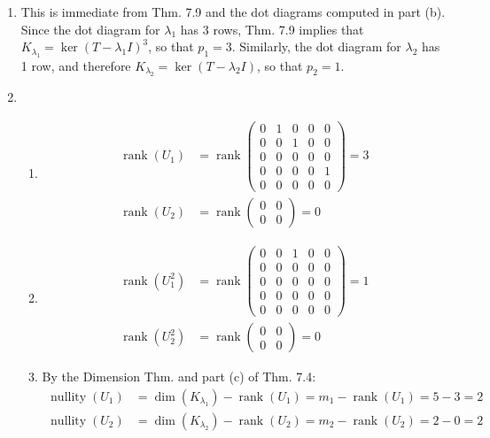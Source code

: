 \documentclass[12pt]{article}
\DeclareMathOperator{\rank}{rank}
\DeclareMathOperator{\nullity}{nullity}
\begin{document}
\begin{enumerate}
\begin{enumerate}
\item
This is immediate from Thm. 7.9 and the dot diagrams computed in part (b). Since the dot diagram for $\lambda_1$ has 3 rows, Thm. 7.9 implies that $K_{\lambda_1} = \ker(T - \lambda_1I)^3$, so that $p_1 = 3$. Similarly, the dot diagram for $\lambda_2$ has 1 row, and therefore $K_{\lambda_2} = \ker(T - \lambda_2I)$, so that $p_2 = 1$.

\item
\begin{enumerate}[label=(\roman*)]
\item
\begin{align*}
\rank(U_1) &= \rank\begin{pmatrix}
0 & 1 & 0 & 0 & 0 \\
0 & 0 & 1 & 0 & 0 \\
0 & 0 & 0 & 0 & 0 \\
0 & 0 & 0 & 0 & 1 \\
0 & 0 & 0 & 0 & 0
\end{pmatrix} = 3 \\
\rank(U_2) &= \rank\begin{pmatrix}
0 & 0 \\
0 & 0
\end{pmatrix} = 0
\end{align*}

\item
\begin{align*}
\rank(U_1^2) &= \rank\begin{pmatrix}
0 & 0 & 1 & 0 & 0 \\
0 & 0 & 0 & 0 & 0 \\
0 & 0 & 0 & 0 & 0 \\
0 & 0 & 0 & 0 & 0 \\
0 & 0 & 0 & 0 & 0
\end{pmatrix} = 1 \\
\rank(U_2^2) &= \rank\begin{pmatrix}
0 & 0 \\
0 & 0
\end{pmatrix} = 0
\end{align*}

\item
By the Dimension Thm. and part (c) of Thm. 7.4:
\begin{align*}
\nullity(U_1) &= \dim(K_{\lambda_1}) - \rank(U_1) = m_1 - \rank(U_1) = 5 - 3 = 2 \\
\nullity(U_2) &= \dim(K_{\lambda_2}) - \rank(U_2) = m_2 - \rank(U_2) = 2 - 0 = 2
\end{align*}


\end{enumerate}
\end{enumerate}
\end{enumerate}
\end{document}
